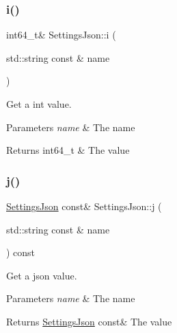 \subsubsection{\texorpdfstring{i()}{i()}\hspace{0.1cm}{\footnotesize\ttfamily [2/2]}}
{\footnotesize\ttfamily int64\+\_\+t\& Settings\+Json\+::i (\begin{DoxyParamCaption}\item[{std\+::string const \&}]{name }\end{DoxyParamCaption})\hspace{0.3cm}{\ttfamily [inline]}}



Get a int value. 


\begin{DoxyParams}{Parameters}
{\em name} & The name \\
\hline
\end{DoxyParams}
\begin{DoxyReturn}{Returns}
int64\+\_\+t \& The value 
\end{DoxyReturn}
\mbox{\label{class_settings_json_a08a5b1f37b4d3d331d0511804d16d162}} 
\subsubsection{\texorpdfstring{j()}{j()}\hspace{0.1cm}{\footnotesize\ttfamily [1/2]}}
{\footnotesize\ttfamily \hyperlink{class_settings_json}{Settings\+Json} const\& Settings\+Json\+::j (\begin{DoxyParamCaption}\item[{std\+::string const \&}]{name }\end{DoxyParamCaption}) const\hspace{0.3cm}{\ttfamily [inline]}}



Get a json value. 


\begin{DoxyParams}{Parameters}
{\em name} & The name \\
\hline
\end{DoxyParams}
\begin{DoxyReturn}{Returns}
\hyperlink{class_settings_json}{Settings\+Json} const\& The value 
\end{DoxyReturn}
\mbox{\label{class_settings_json_a82fa95fc018937756569c75e6bf6cd83}} 
